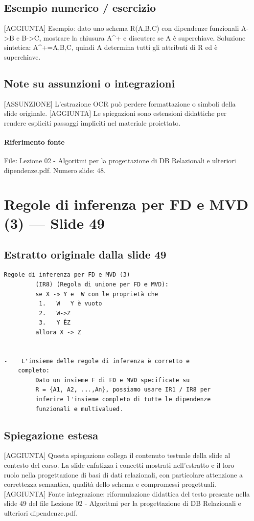 \documentclass[11pt]{article}
\begin{document}
\subsection*{Esempio numerico / esercizio}
[AGGIUNTA] Esempio: dato uno schema R(A,B,C) con dipendenze funzionali A->B e B->C, mostrare la chiusura A^+ e discutere se A è superchiave. Soluzione sintetica: A^+={A,B,C}, quindi A determina tutti gli attributi di R ed è superchiave.
\subsection*{Note su assunzioni o integrazioni}
[ASSUNZIONE] L'estrazione OCR può perdere formattazione o simboli della slide originale.
[AGGIUNTA] Le spiegazioni sono estensioni didattiche per rendere espliciti passaggi impliciti nel materiale proiettato.
\paragraph{Riferimento fonte} File: Lezione 02 - Algoritmi per la progettazione di DB Relazionali e ulteriori dipendenze.pdf. Numero slide: 48.
\section{Regole di inferenza per FD e MVD (3) --- Slide 49}
\subsection*{Estratto originale dalla slide 49}
\begin{lstlisting}
Regole di inferenza per FD e MVD (3)
         (IR8) (Regola di unione per FD e MVD):
         se X -» Y e  W con le proprietà che
          1.   W   Y è vuoto
          2.   W->Z
          3.   Y ÊZ
         allora X -> Z


-    L'insieme delle regole di inferenza è corretto e
    completo:
         Dato un insieme F di FD e MVD specificate su
         R = {A1, A2, ...,An}, possiamo usare IR1 / IR8 per
         inferire l'insieme completo di tutte le dipendenze
         funzionali e multivalued.
\end{lstlisting}
\subsection*{Spiegazione estesa}
[AGGIUNTA] Questa spiegazione collega il contenuto testuale della slide al contesto del corso. La slide enfatizza i concetti mostrati nell'estratto e il loro ruolo nella progettazione di basi di dati relazionali, con particolare attenzione a correttezza semantica, qualità dello schema e compromessi progettuali.
[AGGIUNTA] Fonte integrazione: riformulazione didattica del testo presente nella slide 49 del file Lezione 02 - Algoritmi per la progettazione di DB Relazionali e ulteriori dipendenze.pdf.
\end{document}
